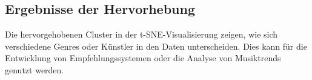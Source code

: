 \subsection{Ergebnisse der Hervorhebung}

Die hervorgehobenen Cluster in der t-SNE-Visualisierung zeigen, wie sich verschiedene Genres oder Künstler in den Daten unterscheiden. Dies kann für die Entwicklung von Empfehlungssystemen oder die Analyse von Musiktrends genutzt werden.



